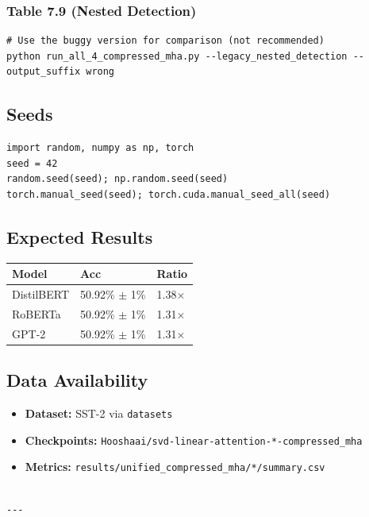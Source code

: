 \subsubsection{Table 7.9 (Nested Detection)}
\begin{lstlisting}
# Use the buggy version for comparison (not recommended)
python run_all_4_compressed_mha.py --legacy_nested_detection --output_suffix wrong
\end{lstlisting}

\subsection{Seeds}

\begin{lstlisting}
import random, numpy as np, torch
seed = 42
random.seed(seed); np.random.seed(seed)
torch.manual_seed(seed); torch.cuda.manual_seed_all(seed)
\end{lstlisting}

\subsection{Expected Results}

\begin{table}[H]
\centering
\small
\begin{tabular}{lll}
\toprule
\textbf{Model} & \textbf{Acc} & \textbf{Ratio} \\
\midrule
DistilBERT & 50.92\% $\pm$ 1\% & 1.38$\times$ \\
RoBERTa & 50.92\% $\pm$ 1\% & 1.31$\times$ \\
GPT-2 & 50.92\% $\pm$ 1\% & 1.31$\times$ \\
\bottomrule
\end{tabular}
\end{table}

\subsection{Data Availability}

\begin{itemize}
\item \textbf{Dataset:} SST-2 via \texttt{datasets}
\item \textbf{Checkpoints:} \texttt{Hooshaai/svd-linear-attention-*-compressed\_mha}
\item \textbf{Metrics:} \texttt{results/unified\_compressed\_mha/*/summary.csv}
\end{itemize}
\begin{lstlisting}

---
\end{lstlisting}

